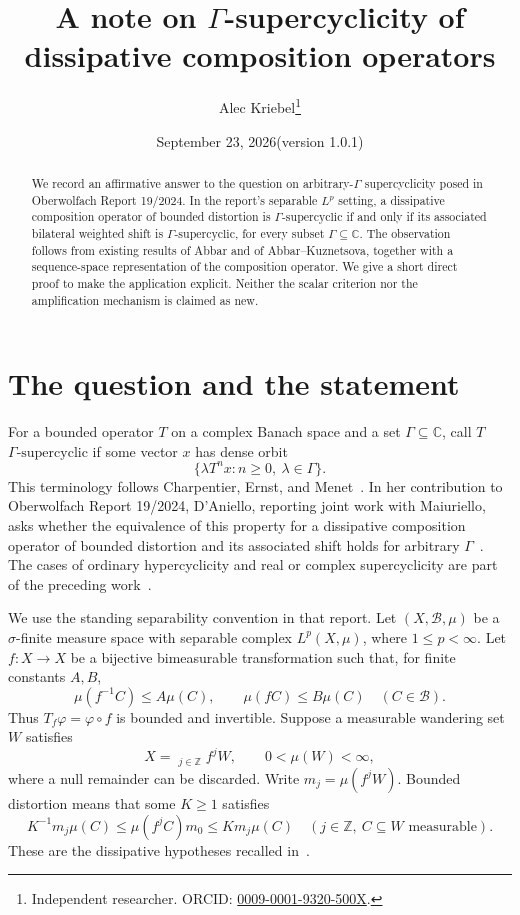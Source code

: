 \documentclass[11pt]{article}
\title{A note on $\Gamma$-supercyclicity of\protect\\ dissipative composition operators}
\author{Alec Kriebel\thanks{Independent researcher. ORCID: \href{https://orcid.org/0009-0001-9320-500X}{0009-0001-9320-500X}.}}
\date{September 23, 2026\quad (version 1.0.1)}
\theoremstyle{remark}
\newcommand{\C}{\mathbb C}
\newcommand{\Z}{\mathbb Z}
\newcommand{\gs}{\Gamma\text{-supercyclic}}
\begin{document}
\maketitle
\begin{abstract}
We record an affirmative answer to the question on arbitrary-$\Gamma$ supercyclicity posed in Oberwolfach Report 19/2024. In the report's separable $L^p$ setting, a dissipative composition operator of bounded distortion is $\gs$ if and only if its associated bilateral weighted shift is $\gs$, for every subset $\Gamma\subseteq\C$. The observation follows from existing results of Abbar and of Abbar--Kuznetsova, together with a sequence-space representation of the composition operator. We give a short direct proof to make the application explicit. Neither the scalar criterion nor the amplification mechanism is claimed as new.
\end{abstract}

\section{The question and the statement}

For a bounded operator $T$ on a complex Banach space and a set $\Gamma\subseteq\C$, call $T$ \emph{$\gs$} if some vector $x$ has dense orbit
\[
\{\lambda T^n x: n\ge0,\ \lambda\in\Gamma\}.
\]
This terminology follows Charpentier, Ernst, and Menet~\cite{CEM}. In her contribution to Oberwolfach Report 19/2024, D'Aniello, reporting joint work with Maiuriello, asks whether the equivalence of this property for a dissipative composition operator of bounded distortion and its associated shift holds for arbitrary $\Gamma$~\cite[p.~1083]{OWR}. The cases of ordinary hypercyclicity and real or complex supercyclicity are part of the preceding work~\cite{DDM,DM}.

We use the standing separability convention in that report. Let $(X,\mathcal B,\mu)$ be a $\sigma$-finite measure space with separable complex $L^p(X,\mu)$, where $1\le p<\infty$. Let $f:X\to X$ be a bijective bimeasurable transformation such that, for finite constants $A,B$,
\begin{equation}\label{eq:bounded}
\mu(f^{-1}C)\le A\mu(C),\qquad \mu(fC)\le B\mu(C)
\quad(C\in\mathcal B).
\end{equation}
Thus $T_f\varphi=\varphi\circ f$ is bounded and invertible. Suppose a measurable wandering set $W$ satisfies
\[
X=\mathop{\dot\bigcup}_{j\in\Z} f^jW,\qquad 0<\mu(W)<\infty,
\]
where a null remainder can be discarded. Write $m_j=\mu(f^jW)$. Bounded distortion means that some $K\ge1$ satisfies
\begin{equation}\label{eq:bd}
K^{-1}m_j\mu(C)\le \mu(f^jC)m_0\le Km_j\mu(C)
\quad(j\in\Z,\ C\subseteq W\text{ measurable}).
\end{equation}
These are the dissipative hypotheses recalled in~\cite[pp.~1079--1080]{OWR}.
\end{document}
